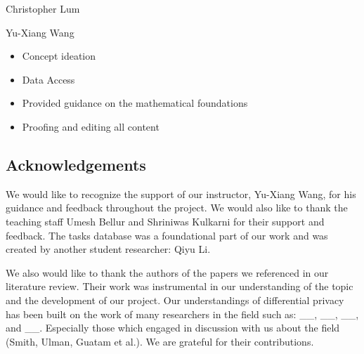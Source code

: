 \documentclass[12pt,letterpaper]{article}
\begin{document}
Christopher Lum

Yu-Xiang Wang
\begin{itemize}
  \item Concept ideation
  \item Data Access
  \item Provided guidance on the mathematical foundations
  \item Proofing and editing all content
\end{itemize}


\subsection{Acknowledgements}

We would like to recognize the support of our instructor, Yu-Xiang Wang, for his guidance and feedback throughout the project. We would also like to thank the teaching staff Umesh Bellur and Shriniwas Kulkarni for their support and feedback. The tasks database was a foundational part of our work and was created by another student researcher: Qiyu Li. 

We also would like to thank the authors of the papers we referenced in our literature review. Their work was instrumental in our understanding of the topic and the development of our project. Our understandings of differential privacy has been built on the work of many researchers in the field such as: \_\_, \_\_, \_\_, and \_\_. Especially those which engaged in discussion with us about the field (Smith, Ulman, Guatam et al.). We are grateful for their contributions.



%

\makereference





\end{document}
